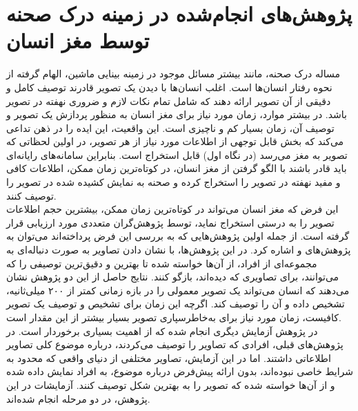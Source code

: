 \section{پژوهش‌های انجام‌شده در زمینه درک صحنه توسط مغز انسان}
مساله درک صحنه، مانند بیشتر مسائل موجود در زمینه بینایی ماشین، الهام گرفته از نحوه رفتار انسان‌ها است. اغلب انسان‌ها با دیدن یک تصویر قادرند توصیف کامل و دقیقی از آن تصویر ارائه دهند که شامل تمام نکات لازم و ضروری نهفته در تصویر باشد. در بیشتر موارد، زمان مورد نیاز برای مغز انسان به منظور پردازش یک تصویر و توصیف آن، زمان بسیار کم و ناچیزی است. این واقعیت، این ایده را در ذهن تداعی می‌کند که بخش قابل توجهی از اطلاعات مورد نیاز از هر تصویر، در اولین لحظاتی که تصویر به مغز می‌رسد (در نگاه اول) قابل استخراج است. بنابراین سامانه‌های رایانه‌ای باید قادر باشند با الگو گرفتن از مغز انسان، در کوتاه‌ترین زمان ممکن، اطلاعات کافی و مفید نهفته در تصویر را استخراج کرده و صحنه به نمایش کشیده شده در تصویر را توصیف کنند.
\\
این فرض که مغز انسان می‌تواند در کوتاه‌ترین زمان ممکن، بیشترین حجم اطلاعات تصویر را به درستی استخراج نماید، توسط پژوهش‌گران متعددی مورد ارزیابی قرار گرفته است. از جمله اولین پژوهش‌هایی که به بررسی این فرض پرداخته‌اند می‌توان به پژوهش‌های 
\cite{potter1976short}
و
\cite{potter2002recognition}
اشاره کرد. در این‌ پژوهش‌ها، با نشان دادن تصاویر به صورت دنباله‌ای به مجموعه‌ای از افراد، از آن‌ها خواسته شده تا بهترین و دقیق‌ترین توصیفی را که می‌توانند، برای تصاویری که دیده‌اند، بازگو کنند. نتایج حاصل از این دو پژوهش نشان می‌دهند که انسان می‌تواند یک تصویر معمولی را در بازه زمانی کمتر از ۲۰۰ میلی‌ثانیه، تشخیص داده و آن را توصیف کند. اگرچه این زمان برای تشخیص و توصیف یک تصویر کافیست، زمان مورد نیاز برای به‌خاطرسپاری تصویر بسیار بیشتر از این مقدار است.
\\
در پژوهش\cite{fei2007we}
آزمایش دیگری انجام شده که از اهمیت بسیاری برخوردار است. در پژوهش‌های قبلی، افرادی که تصاویر را توصیف می‌کردند، درباره موضوع کلی تصاویر اطلاعاتی داشتند. اما در این آزمایش، تصاویر مختلفی از دنیای واقعی که محدود به شرایط خاصی نبوده‌اند، بدون ارائه پیش‌فرض درباره موضوع، به افراد نمایش داده شده و از آن‌ها خواسته شده که تصویر را به بهترین شکل توصیف کنند. آزمایشات در این پژوهش، در دو مرحله انجام شده‌اند.
